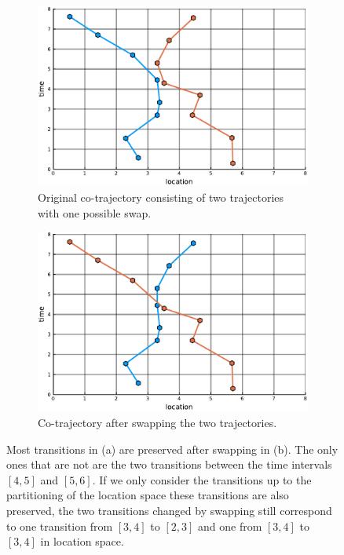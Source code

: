 \documentclass[12pt]{article}
\theoremstyle{definition}
\begin{document}
\begin{figure}
  \centering
  \begin{subfigure}[t]{0.49\textwidth}
    \includegraphics[width=\textwidth]{swapping_tempospatial_grid-a.pdf}
    \caption{Original co-trajectory consisting of two trajectories
      with one possible swap.}
    \label{fig:swapping-tempo-spatial-a}
  \end{subfigure}
  \begin{subfigure}[t]{0.49\textwidth}
    \includegraphics[width=\textwidth]{swapping_tempospatial_grid-b.pdf}
    \caption{Co-trajectory after swapping the two trajectories.}
    \label{fig:swapping-tempo-spatial-b}
  \end{subfigure}
  \caption{Most transitions in (a) are preserved after swapping in
    (b). The only ones that are not are the two transitions between
    the time intervals \([4, 5]\) and \([5, 6]\). If we only consider
    the transitions up to the partitioning of the location space these
    transitions are also preserved, the two transitions changed by
    swapping still correspond to one transition from \([3, 4]\) to
    \([2, 3]\) and one from \([3, 4]\) to \([3, 4]\) in location
    space.}
  \label{fig:swapping-tempo-spatial}
\end{figure}
\end{document}
